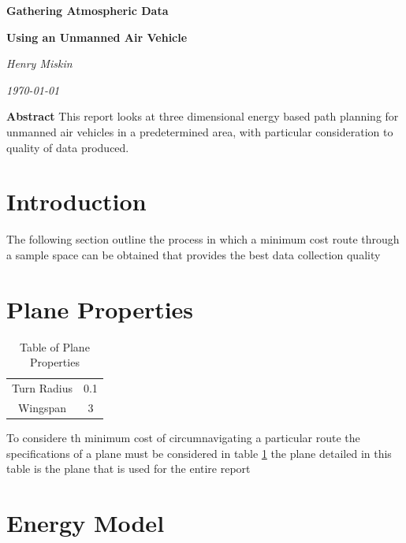 \documentclass[a4paper,12pt,twoside]{article}
\begin{document}
\onehalfspacing

\begin{titlepage}
\clearpage
\vspace*{\fill}
\begin{center}
\begin{minipage}{.6\textwidth}
\centerline{\textbf{\huge Gathering Atmospheric Data}}
\centerline{\textbf{\large Using an Unmanned Air Vehicle}}
\centerline{\textit{Henry Miskin}}
\centerline{\textit{\today}}
\end{minipage}
\end{center}
\vspace{5cm}
\center
\textbf{Abstract}
\center
This report looks at three dimensional energy based path planning for unmanned air vehicles in a predetermined area, with particular consideration to quality of data produced.
\vfill

\clearpage
\end{titlepage}
\tableofcontents
\clearpage

\section{Introduction}
\label{sec:introduction}

The following section outline the process in which a minimum cost route through a sample space can be obtained that provides the best data collection quality

\section{Plane Properties}
\label{sec:plane_properties}

\begin{table}[width=\textwidth]
\centering
    \begin{tabular}{cc}
    Turn Radius	& 0.1	\\
Wingspan	& 3	\\

    \end{tabular}
\caption{Table of Plane Properties}
\label{tbl:table_of_plane_properties}
\end{table}

To considere th minimum cost of circumnavigating a particular route the specifications of a plane must be considered in table \ref{tbl:table_of_plane_properties} the plane detailed in this table is the plane that is used for the entire report

\section{Energy Model}
\label{sec:energy_model}
\end{document}
